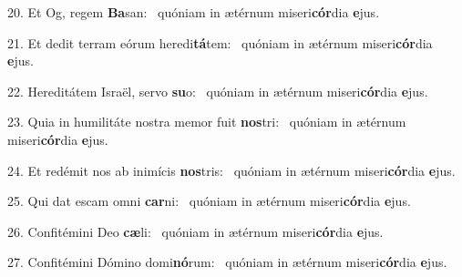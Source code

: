 20. Et Og, regem \textbf{Ba}san: \ast\  quóniam in ætérnum miseri\textbf{cór}dia \textbf{e}jus.\

21. Et dedit terram eórum heredi\textbf{tá}tem: \ast\  quóniam in ætérnum miseri\textbf{cór}dia \textbf{e}jus.\

22. Hereditátem Israël, servo \textbf{su}o: \ast\  quóniam in ætérnum miseri\textbf{cór}dia \textbf{e}jus.\

23. Quia in humilitáte nostra memor fuit \textbf{nos}tri: \ast\  quóniam in ætérnum miseri\textbf{cór}dia \textbf{e}jus.\

24. Et redémit nos ab inimícis \textbf{nos}tris: \ast\  quóniam in ætérnum miseri\textbf{cór}dia \textbf{e}jus.\

25. Qui dat escam omni \textbf{car}ni: \ast\  quóniam in ætérnum miseri\textbf{cór}dia \textbf{e}jus.\

26. Confitémini Deo \textbf{cæ}li: \ast\  quóniam in ætérnum miseri\textbf{cór}dia \textbf{e}jus.\

27. Confitémini Dómino domi\textbf{nó}rum: \ast\  quóniam in ætérnum miseri\textbf{cór}dia \textbf{e}jus.\

